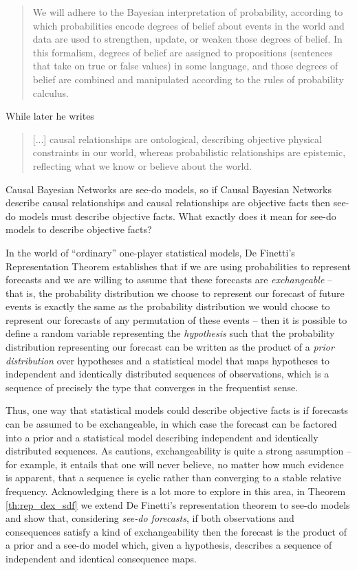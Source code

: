 \begin{quote}
We will adhere to the Bayesian interpretation of probability, according to which probabilities encode degrees of belief about events in the world and data are used to strengthen, update, or weaken those degrees of belief. In this formalism, degrees of belief are assigned to propositions (sentences that take on true or false values) in some language, and those degrees of belief are combined and manipulated according to the rules of probability calculus.
\end{quote}

While later he writes

\begin{quote}
[...] causal relationships are ontological, describing objective physical constraints in our world, whereas probabilistic relationships are epistemic, reflecting what we know or believe about the world.
\end{quote}

Causal Bayesian Networks are see-do models, so if Causal Bayesian Networks describe causal relationships and causal relationships are objective facts then see-do models must describe objective facts. What exactly does it mean for see-do models to describe objective facts?

In the world of ``ordinary'' one-player statistical models, De Finetti's Representation Theorem establishes that if we are using probabilities to represent forecasts and we are willing to assume that these forecasts are \emph{exchangeable} -- that is, the probability distribution we choose to represent our forecast of future events is exactly the same as the probability distribution we would choose to represent our forecasts of any permutation of these events -- then it is possible to define a random variable representing the \emph{hypothesis} such that the probability distribution representing our forecast can be written as the product of a \emph{prior distribution} over hypotheses and a statistical model that maps hypotheses to independent and identically distributed sequences of observations, which is a sequence of precisely the type that converges in the frequentist sense.

Thus, one way that statistical models could describe objective facts is if forecasts can be assumed to be exchangeable, in which case the forecast can be factored into a prior and a statistical model describing  independent and identically distributed sequences. As \citet{walley_statistical_1991} cautions, exchangeability is quite a strong assumption -- for example, it entails that one will never believe, no matter how much evidence is apparent, that a sequence is cyclic rather than converging to a stable relative frequency. Acknowledging there is a lot more to explore in this area, in Theorem \ref{th:rep_dex_sdf} we extend De Finetti's representation theorem to see-do models and show that, considering \emph{see-do forecasts}, if both observations and consequences satisfy a kind of exchangeability then the forecast is the product of a prior and a see-do model which, given a hypothesis, describes a sequence of independent and identical consequence maps.

